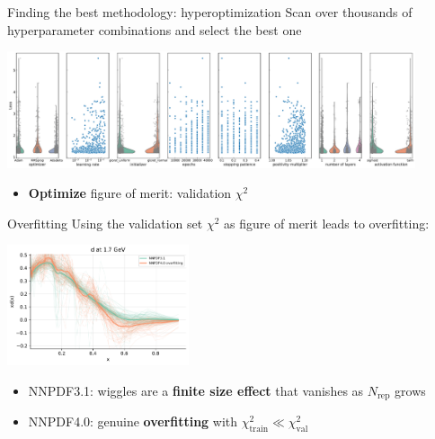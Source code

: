 \documentclass[aspectratio=169,10pt]{beamer}
\begin{document}
\begin{frame}{Finding the best methodology: hyperoptimization}
Scan over thousands of hyperparameter combinations and select the best one
\begin{center}
\includegraphics[width=0.9\textwidth]{methodology/hyperopt_scan}
\end{center}
    \begin{itemize}
        \item \textbf{Optimize} figure of merit: validation $\chi^2$
    \end{itemize}
\end{frame}



\begin{frame}{Overfitting}
Using the validation set $\chi^2$ as figure of merit leads to overfitting:
\begin{center}
\includegraphics[width=0.4\textwidth]{methodology/overfit_nnpdf31}
\end{center}
    \begin{itemize}
        \item NNPDF3.1: wiggles are a \textbf{finite size effect} that vanishes as $N_\mathrm{rep}$ grows
        \item NNPDF4.0: genuine \textbf{overfitting} with $\chi^2_\mathrm{train} \ll \chi^2_\mathrm{val}$
    \end{itemize}
\end{frame}
\end{document}

